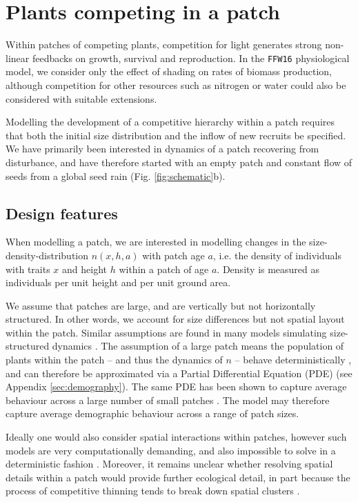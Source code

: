 \documentclass[a4paper,11pt]{article}
\begin{document}
\section{Plants competing in a patch}

Within patches of competing plants, competition for light generates
strong non-linear feedbacks on growth, survival and reproduction. In the
\texttt{FFW16} physiological model, we consider only the effect of
shading on rates of biomass production, although competition for other
resources such as nitrogen or water could also be considered with
suitable extensions.

Modelling the development of a competitive hierarchy within a patch
requires that both the initial size distribution and the inflow of new
recruits be specified. We have primarily been interested in dynamics of
a patch recovering from disturbance, and have therefore started with an
empty patch and constant flow of seeds from a global seed rain (Fig.
\ref{fig:schematic}b).

\subsection{Design features}

When modelling a patch, we are interested in modelling changes in the
size-density-distribution \(n(x,h,a)\) with patch age \(a\), i.e. the density of
individuals with traits \(x\) and height \(h\) within a patch of age \(a\). Density
is measured as individuals per unit height and per unit ground area.

We assume that patches are large, and are vertically but not horizontally
structured. In other words, we account for size differences but not spatial 
layout within the patch. Similar assumptions are found in many models
simulating size-structured dynamics
\citep{Moorcroft-2001, Huston-1987, Smith-2014,Kohyama-1993}. The assumption of a large
patch means the population of plants within the patch -- and thus the 
dynamics of \(n\) -- behave deterministically \citep{Deroos-1997}, and can therefore be
approximated via a Partial Differential Equation (PDE) (see Appendix
\ref{sec:demography}). The same PDE has been shown to capture average behaviour
across a large number of small patches \citep{Moorcroft-2001}. The model may 
therefore capture average demographic behaviour across a range of patch sizes.

Ideally one would also consider spatial interactions within patches,
however such models are very computationally demanding, and also
impossible to solve in a deterministic fashion \citep{Huston-1987, 
Pacala-1996}.
Moreover, it remains unclear whether resolving spatial details within a
patch would provide further ecological detail, in part because the
process of competitive thinning tends to break down spatial clusters
\citep{Strigul-2008}.
\end{document}

